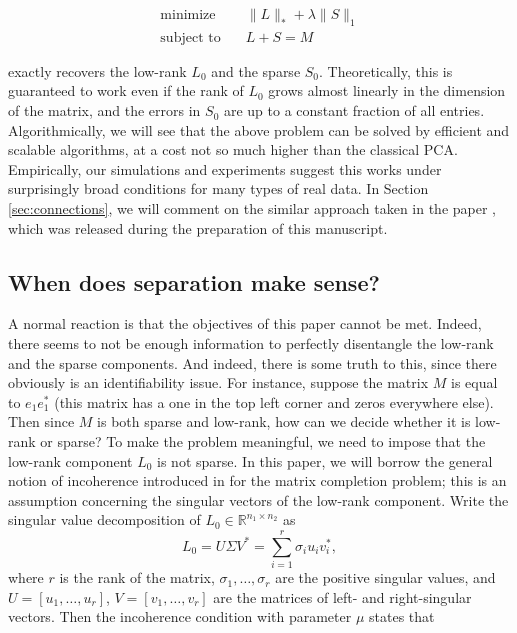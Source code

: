 \begin{equation}
\label{eq:sdp}
  \begin{array}{ll}
    \text{minimize}   & \quad \|L\|_* + \lambda \|S\|_1\\
    \text{subject to} & \quad L + S = M 
  \end{array}
\end{equation}

exactly recovers the low-rank $L_0$ and the sparse $S_0$. Theoretically, this is guaranteed to work even if the rank of $L_0$ grows almost linearly in the dimension of the matrix, and the errors in $S_0$ are up to a constant fraction of all entries. Algorithmically, we will see that the above problem can be solved by efficient and scalable algorithms, at a cost not so much higher than the classical PCA. Empirically, our simulations and experiments suggest this works under surprisingly broad conditions for many types of real data. In Section \ref{sec:connections}, we will comment on the similar approach taken in the paper \cite{Venkat-09}, which was released during the preparation of this manuscript.

\subsection{When does separation make sense?}
\label{sec:incoherence}

A normal reaction is that the objectives of this paper cannot be met. Indeed, there seems to not be enough information to perfectly disentangle the low-rank and the sparse components. And indeed, there is some truth to this, since there obviously is an identifiability issue. For instance, suppose the matrix $M$ is equal to $e_1 e_1^*$ (this matrix has a one in the top left corner and zeros everywhere else). Then since $M$ is both sparse and low-rank, how can we decide whether it is low-rank or sparse? To make the problem meaningful, we need to impose that the low-rank component $L_0$ is not sparse.  In this paper, we will borrow the general notion of incoherence introduced in \cite{CR08} for the matrix completion problem; this is an assumption concerning the singular vectors of the low-rank component. Write the singular value decomposition of $L_0 \in \mathbb{R}^{n_1
  \times n_2}$ as
\[
L_0 = U \Sigma V^* = \sum_{i = 1}^r \sigma_i u_i v_i^*, 
\]
where $r$ is the rank of the matrix, $\sigma_1, \ldots, \sigma_r$ are the positive singular values, and $U = [u_1, \ldots, u_r]$, $V = [v_1,
\ldots, v_r]$ are the matrices of left- and right-singular vectors. Then the incoherence condition with parameter $\mu$ states that

